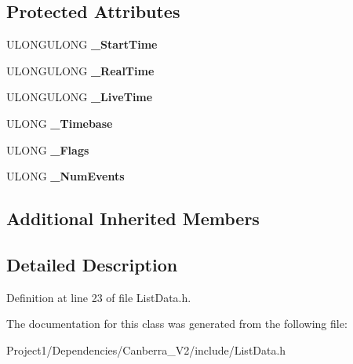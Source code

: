 \subsection*{Protected Attributes}
\begin{DoxyCompactItemize}
\item 
\mbox{\label{class_canberra_1_1_data_types_1_1_spectroscopy_1_1_list_data_base_a2666297f74d8eb01604780d502a34eca}} 
U\+L\+O\+N\+G\+U\+L\+O\+NG {\bfseries \+\_\+\+Start\+Time}
\item 
\mbox{\label{class_canberra_1_1_data_types_1_1_spectroscopy_1_1_list_data_base_a7281313da9a3a52ac927235b780a4080}} 
U\+L\+O\+N\+G\+U\+L\+O\+NG {\bfseries \+\_\+\+Real\+Time}
\item 
\mbox{\label{class_canberra_1_1_data_types_1_1_spectroscopy_1_1_list_data_base_a81591ca6c6e6f50da2c43902cde232a8}} 
U\+L\+O\+N\+G\+U\+L\+O\+NG {\bfseries \+\_\+\+Live\+Time}
\item 
\mbox{\label{class_canberra_1_1_data_types_1_1_spectroscopy_1_1_list_data_base_a4cd5d6a50fc9eb59470d57612d41ecc5}} 
U\+L\+O\+NG {\bfseries \+\_\+\+Timebase}
\item 
\mbox{\label{class_canberra_1_1_data_types_1_1_spectroscopy_1_1_list_data_base_abe6fee0b4193dbdec654f4133111c881}} 
U\+L\+O\+NG {\bfseries \+\_\+\+Flags}
\item 
\mbox{\label{class_canberra_1_1_data_types_1_1_spectroscopy_1_1_list_data_base_a53679e1ac4e4f44154de38f4ab788a40}} 
U\+L\+O\+NG {\bfseries \+\_\+\+Num\+Events}
\end{DoxyCompactItemize}
\subsection*{Additional Inherited Members}


\subsection{Detailed Description}


Definition at line 23 of file List\+Data.\+h.



The documentation for this class was generated from the following file\+:\begin{DoxyCompactItemize}
\item 
Project1/\+Dependencies/\+Canberra\+\_\+\+V2/include/List\+Data.\+h\end{DoxyCompactItemize}
